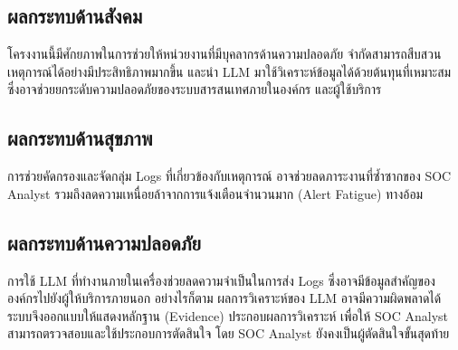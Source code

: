 



\subsection{ผลกระทบด้านสังคม}
โครงงานนี้มีศักยภาพในการช่วยให้หน่วยงานที่มีบุคลากรด้านความปลอดภัย
จำกัดสามารถสืบสวนเหตุการณ์ได้อย่างมีประสิทธิภาพมากขึ้น
และนำ LLM มาใช้วิเคราะห์ข้อมูลได้ด้วยต้นทุนที่เหมาะสม
ซึ่งอาจช่วยยกระดับความปลอดภัยของระบบสารสนเทศภายในองค์กร
และผู้ใช้บริการ

\subsection{ผลกระทบด้านสุขภาพ}
การช่วยคัดกรองและจัดกลุ่ม Logs ที่เกี่ยวข้องกับเหตุการณ์
อาจช่วยลดภาระงานที่ซ้ำซากของ SOC Analyst
รวมถึงลดความเหนื่อยล้าจากการแจ้งเตือนจำนวนมาก
(Alert Fatigue) ทางอ้อม

\subsection{ผลกระทบด้านความปลอดภัย}
การใช้ LLM ที่ทำงานภายในเครื่องช่วยลดความจำเป็นในการส่ง
Logs ซึ่งอาจมีข้อมูลสำคัญขององค์กรไปยังผู้ให้บริการภายนอก
อย่างไรก็ตาม ผลการวิเคราะห์ของ LLM อาจมีความผิดพลาดได้
ระบบจึงออกแบบให้แสดงหลักฐาน (Evidence) ประกอบผลการวิเคราะห์
เพื่อให้ SOC Analyst สามารถตรวจสอบและใช้ประกอบการตัดสินใจ
โดย SOC Analyst ยังคงเป็นผู้ตัดสินใจขั้นสุดท้าย

